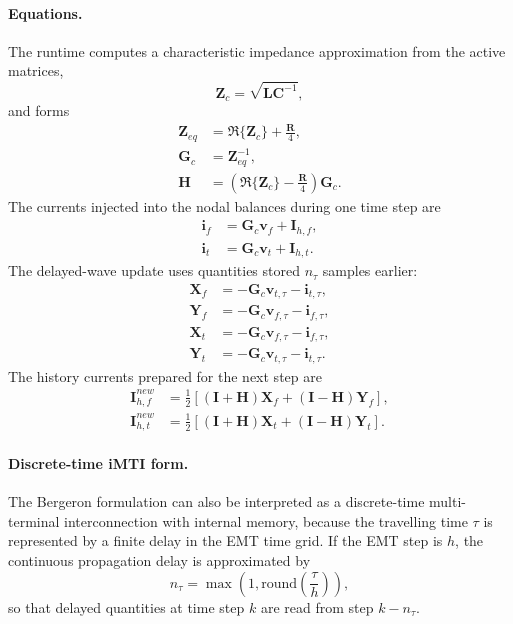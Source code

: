 \paragraph{Equations.}
The runtime computes a characteristic impedance approximation from the active matrices,
\begin{equation}
    \mathbf{Z}_c = \sqrt{\mathbf{L}\mathbf{C}^{-1}},
\end{equation}
and forms
\begin{align}
    \mathbf{Z}_{eq} &= \Re\{\mathbf{Z}_c\}+\frac{\mathbf{R}}{4}, \\
    \mathbf{G}_c &= \mathbf{Z}_{eq}^{-1}, \\
    \mathbf{H} &= \left(\Re\{\mathbf{Z}_c\}-\frac{\mathbf{R}}{4}\right)\mathbf{G}_c.
\end{align}
The currents injected into the nodal balances during one time step are
\begin{align}
    \mathbf{i}_f &= \mathbf{G}_c\mathbf{v}_f + \mathbf{I}_{h,f}, \\
    \mathbf{i}_t &= \mathbf{G}_c\mathbf{v}_t + \mathbf{I}_{h,t}.
\end{align}
The delayed-wave update uses quantities stored $n_\tau$ samples earlier:
\begin{align}
    \mathbf{X}_f &= -\mathbf{G}_c\mathbf{v}_{t,\tau}-\mathbf{i}_{t,\tau}, \\
    \mathbf{Y}_f &= -\mathbf{G}_c\mathbf{v}_{f,\tau}-\mathbf{i}_{f,\tau}, \\
    \mathbf{X}_t &= -\mathbf{G}_c\mathbf{v}_{f,\tau}-\mathbf{i}_{f,\tau}, \\
    \mathbf{Y}_t &= -\mathbf{G}_c\mathbf{v}_{t,\tau}-\mathbf{i}_{t,\tau}.
\end{align}
The history currents prepared for the next step are
\begin{align}
    \mathbf{I}_{h,f}^{new}
    &= \frac{1}{2}\left[(\mathbf{I}+\mathbf{H})\mathbf{X}_f+(\mathbf{I}-\mathbf{H})\mathbf{Y}_f\right], \\
    \mathbf{I}_{h,t}^{new}
    &= \frac{1}{2}\left[(\mathbf{I}+\mathbf{H})\mathbf{X}_t+(\mathbf{I}-\mathbf{H})\mathbf{Y}_t\right].
\end{align}

\paragraph{Discrete-time iMTI form.}
The Bergeron formulation can also be interpreted as a discrete-time multi-terminal interconnection with internal memory, because the travelling time $\tau$ is represented by a finite delay in the EMT time grid. If the EMT step is $h$, the continuous propagation delay is approximated by
\begin{equation}
    n_\tau = \max\left(1,\mathrm{round}\left(\frac{\tau}{h}\right)\right),
\end{equation}
so that delayed quantities at time step $k$ are read from step $k-n_\tau$.

